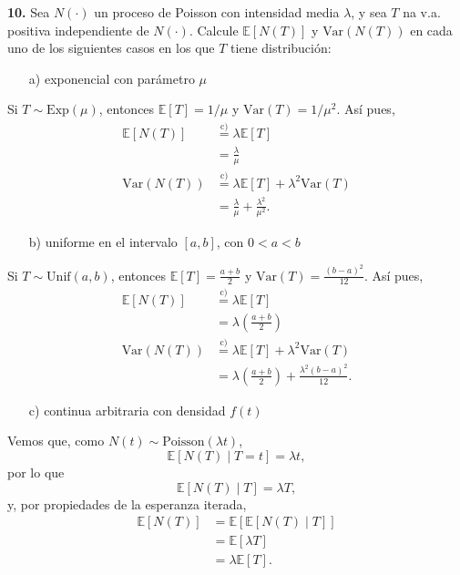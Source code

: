 \documentclass[12pt]{article}
\newcommand{\E}{\mathbb{E}}
\begin{document}
\begin{tcolorbox}[colback=blue!5!white, colframe=blue!5!white, arc=0mm, boxrule=0pt]
\textbf{10.} Sea $N(\cdot)$ un proceso de Poisson con intensidad media $\lambda$, y sea $T$ na v.a. positiva independiente de $N(\cdot)$. Calcule $\E[N(T)]$ y $\textrm{Var}(N(T))$ en cada uno de los siguientes casos en los que $T$ tiene distribución:
\begin{itemize}
    \item[a)] exponencial con parámetro $\mu$
\end{itemize}
\end{tcolorbox}
Si $T \sim \textrm{Exp}(\mu)$, entonces $\E[T] = 1/\mu$ y $\textrm{Var}(T) = 1/\mu^2$. Así pues, 
\begin{align*}
    \E[N(T)] &\overset{\mathrm{c)}}{=} \lambda \E[T] \\
    &= \frac{\lambda}{\mu} \\
    \textrm{Var}(N(T)) &\overset{\mathrm{c)}}{=} \lambda \E[T] + \lambda^2 \textrm{Var}(T) \\
    &= \frac{\lambda}{\mu} + \frac{\lambda^2}{\mu^2}.
\end{align*}

\begin{tcolorbox}[colback=blue!5!white, colframe=blue!5!white, arc=0mm, boxrule=0pt]
\begin{itemize}
    \item[b)] uniforme en el intervalo $[a,b]$, con $0<a<b$
\end{itemize}
\end{tcolorbox}
Si $T \sim \textrm{Unif}(a,b)$, entonces $\E[T] = \frac{a+b}{2}$ y $\textrm{Var}(T) = \frac{(b-a)^2}{12}$. Así pues, 
\begin{align*}
    \E[N(T)] &\overset{\mathrm{c)}}{=} \lambda \E[T] \\
    &= \lambda \left( \frac{a+b}{2} \right) \\
    \textrm{Var}(N(T)) &\overset{\mathrm{c)}}{=} \lambda \E[T] + \lambda^2 \textrm{Var}(T) \\
    &= \lambda \left( \frac{a+b}{2} \right) + \frac{\lambda^2 (b-a)^2}{12} .
\end{align*}

\begin{tcolorbox}[colback=blue!5!white, colframe=blue!5!white, arc=0mm, boxrule=0pt]
\begin{itemize}
    \item[c)] continua arbitraria con densidad $f(t)$
\end{itemize}
\end{tcolorbox}
Vemos que, como $N(t) \sim \textrm{Poisson}(\lambda t)$,
\[ \E[N(T) \mid T = t] = \lambda t, \]
    por lo que 
    \[ \E[N(T) \mid T] = \lambda T, \]
y, por propiedades de la esperanza iterada, 
\begin{align*}
    \E[N(T)] &= \E [ \E[N(T) \mid T] ] \\
                &= \E [\lambda T] \\
                &= \lambda \E[T].
\end{align*}
\end{document}

